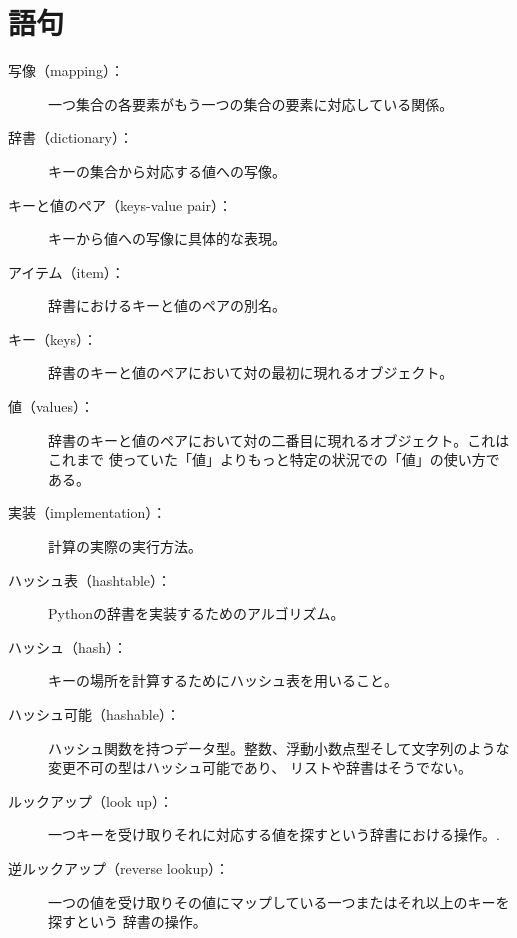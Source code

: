 \documentclass[a4j,12pt,makeidx]{jbook}
\begin{document}
\section{語句}
\begin{description}

\item[写像（mapping）：] 一つ集合の各要素がもう一つの集合の要素に対応している関係。

\item[辞書（dictionary）：] キーの集合から対応する値への写像。 

\item[キーと値のペア（keys-value pair）：] キーから値への写像に具体的な表現。

\item[アイテム（item）：] 辞書におけるキーと値のペアの別名。

\item[キー（keys）：] 辞書のキーと値のペアにおいて対の最初に現れるオブジェクト。

\item[値（values）：] 辞書のキーと値のペアにおいて対の二番目に現れるオブジェクト。これはこれまで
使っていた「値」よりもっと特定の状況での「値」の使い方である。

\item[実装（implementation）：] 計算の実際の実行方法。

\item[ハッシュ表（hashtable）：] Pythonの辞書を実装するためのアルゴリズム。

\item[ハッシュ（hash）：] キーの場所を計算するためにハッシュ表を用いること。

\item[ハッシュ可能（hashable）：] ハッシュ関数を持つデータ型。整数、浮動小数点型そして文字列のような変更不可の型はハッシュ可能であり、
リストや辞書はそうでない。

\item[ルックアップ（look up）：] 一つキーを受け取りそれに対応する値を探すという辞書における操作。.

\item[逆ルックアップ（reverse lookup）：] 一つの値を受け取りその値にマップしている一つまたはそれ以上のキーを探すという
辞書の操作。


\end{description}
\end{document}
